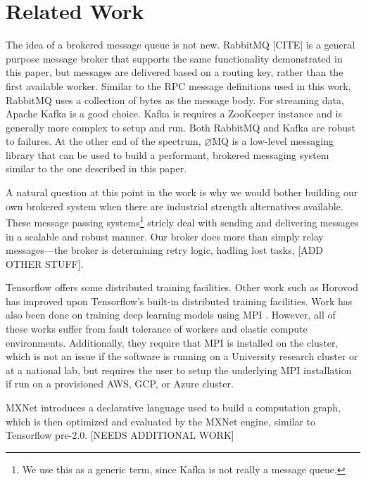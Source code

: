 \documentclass[conference]{IEEEtran}
\begin{document}
\section{Related Work}
The idea of a brokered message queue is not new. RabbitMQ [CITE] is a general
purpose message broker that supports the same functionality demonstrated
in this paper, but messages are delivered based on a routing key, rather than
the first available worker. Similar to the RPC message definitions used in
this work, RabbitMQ uses a collection of bytes as the message body. For
streaming data, Apache Kafka \cite{kafka} is a good choice. Kafka is requires a
ZooKeeper \cite{Hunt:2010:ZWC:1855840.1855851} instance and is generally
more complex to setup and run.
Both RabbitMQ and Kafka are robust to failures. At the other end of the
spectrum, $\varnothing$MQ is a low-level messaging library that can be used
to build a performant, brokered messaging system similar to the one described
in this paper.

A natural question at this point in the work is why we would bother building our
own brokered system when there are industrial strength alternatives
available. These message passing systems\footnote{We use this as a generic term,
  since Kafka is not really a message queue.} stricly deal with sending and
delivering messages in a scalable and robust manner. Our broker does more than
simply relay messages---the broker is determining retry logic, hadling lost
tasks, [ADD OTHER STUFF].

Tensorflow \cite{tensorflow2015-whitepaper} offers some distributed training
facilities. Other work such as Horovod \cite{DBLP:journals/corr/abs-1802-05799}
has improved upon Tensorflow's built-in distributed training facilities. Work
has also been done on training deep learning models using MPI
\cite{pmlr-v28-coates13, DBLP:journals/corr/VishnuSD16}. However, all of these
works suffer from fault tolerance of workers and elastic compute
environments. Additionally, they require that MPI is installed on the cluster,
which is not an issue if the software is running on a University research
cluster or at a national lab, but requires the user to setup the underlying MPI
installation if run on a provisioned AWS, GCP, or Azure cluster.

MXNet \cite{DBLP:journals/corr/ChenLLLWWXXZZ15} introduces a declarative language
used to build a computation graph, which is then optimized and evaluated by the
MXNet engine, similar to Tensorflow pre-2.0. [NEEDS ADDITIONAL WORK]
\end{document}
